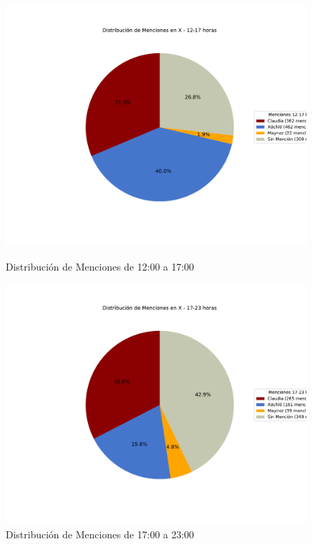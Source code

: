 \documentclass[10pt, a4paper]{article}
\begin{document}
	\begin{figure}[h!]
		\centering
		\begin{minipage}{0.49\textwidth} %
			\includegraphics[width=\linewidth]{grafica_intervalo_12-17.pdf} 
			\vspace{-15mm}
			\caption{Distribución de Menciones de 12:00 a 17:00}
			\label{fig:xIntervalo1217}
		\end{minipage}
		\hfill %
		\begin{minipage}{0.49\textwidth}
			\includegraphics[width=\linewidth]{grafica_intervalo_17-23.pdf}
			\vspace{-15mm}
			\caption{Distribución de Menciones de 17:00 a 23:00}
			\label{fig:xIntervalo1723}
		\end{minipage}
	\end{figure}
\end{document}
